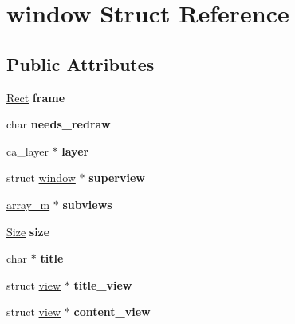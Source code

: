 \hypertarget{structwindow}{}\section{window Struct Reference}
\label{structwindow}
\subsection*{Public Attributes}
\begin{DoxyCompactItemize}
\item 
\mbox{\label{structwindow_a45eb01bfeb9dfb5c7c59f8b26aa5d955}} 
\hyperlink{structrect}{Rect} {\bfseries frame}
\item 
\mbox{\label{structwindow_a63f9204e96fdd2ab14be28829f4a1419}} 
char {\bfseries needs\+\_\+redraw}
\item 
\mbox{\label{structwindow_ab901f99192c421827cc2837db570c539}} 
ca\+\_\+layer $\ast$ {\bfseries layer}
\item 
\mbox{\label{structwindow_ae6b9c132855583def781c8e5ffe7171f}} 
struct \hyperlink{structwindow}{window} $\ast$ {\bfseries superview}
\item 
\mbox{\label{structwindow_a08d8f381adc5ae8430143a30a1638d77}} 
\hyperlink{structarray__m}{array\+\_\+m} $\ast$ {\bfseries subviews}
\item 
\mbox{\label{structwindow_a59dafa3a776e56d56a3b716ae3dd9e20}} 
\hyperlink{structsize}{Size} {\bfseries size}
\item 
\mbox{\label{structwindow_afb370b285baef0c4e76d46329a6655f9}} 
char $\ast$ {\bfseries title}
\item 
\mbox{\label{structwindow_a186299af4ec058ae84521c5e22469f4f}} 
struct \hyperlink{structview}{view} $\ast$ {\bfseries title\+\_\+view}
\item 
\mbox{\label{structwindow_a01d42fbf1e958c86772f114fd2e26645}} 
struct \hyperlink{structview}{view} $\ast$ {\bfseries content\+\_\+view}
\item 
\mbox{\label{structwindow_a81d645addf872455eea41adc20a6acc6}} 

\end{DoxyCompactItemize}
